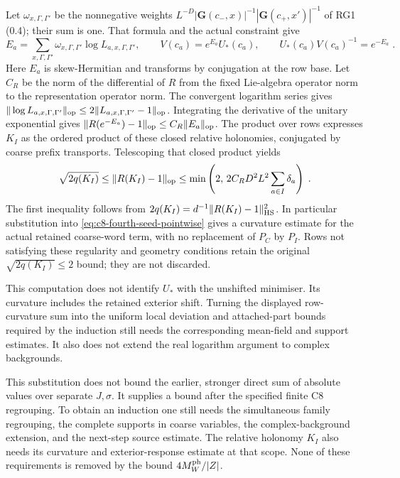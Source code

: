 \documentclass[11pt]{article}
\begin{document}
Let $\omega_{x,\Gamma,\Gamma'}$ be the nonnegative weights
$L^{-D}|\mathbf G(c_-,x)|^{-1}
|\mathbf G(c_+,x')|^{-1}$ of RG1 (0.4); their sum is one.
That formula and the actual constraint give
\begin{equation}\label{eq:c8-fourth-average-relative}
    E_a=\sum_{x,\Gamma,\Gamma'}\omega_{x,\Gamma,\Gamma'}
            \log L_{a,x,\Gamma,\Gamma'},\qquad
    V(c_a)=e^{E_a}U_*(c_a),\qquad
    U_*(c_a)V(c_a)^{-1}=e^{-E_a}\;.
\end{equation}
Here $E_a$ is skew-Hermitian and transforms by conjugation at
the row base. Let $C_R$ be the norm of the differential of $R$
from the fixed Lie-algebra operator norm to the representation
operator norm. The convergent logarithm series gives
$\|\log L_{a,x,\Gamma,\Gamma'}\|_{\rm op}
\leq2\|L_{a,x,\Gamma,\Gamma'}-1\|_{\rm op}$.
Integrating the derivative of the unitary exponential gives
$\|R(e^{-E_a})-1\|_{\rm op}\leq C_R\|E_a\|_{\rm op}$.
The product over rows expresses $K_I$ as the ordered product
of these closed relative holonomies, conjugated by coarse
prefix transports. Telescoping that closed product yields
\begin{equation}\label{eq:c8-fourth-coarse-curvature}
    \sqrt{2q(K_I)}
        \leq \|R(K_I)-1\|_{\rm op}
        \leq \min\left(2,\,
            2C_RD^2L^2\sum_{a\in I}\delta_a\right)\;.
\end{equation}
The first inequality follows from
$2q(K_I)=d^{-1}\|R(K_I)-1\|_{\rm HS}^2$.
In particular substitution into
\eqref{eq:c8-fourth-seed-pointwise} gives a curvature estimate
for the actual retained coarse-word term, with no replacement
of $P_C$ by $P_I$. Rows not satisfying these regularity and
geometry conditions retain the original $\sqrt{2q(K_I)}\leq2$
bound; they are not discarded.

This computation does not identify $U_*$ with the unshifted
minimiser. Its curvature includes the retained exterior shift.
Turning the displayed row-curvature sum into the uniform
local deviation and attached-part bounds required by the
induction still needs the corresponding mean-field and
support estimates. It also does not extend the real logarithm
argument to complex backgrounds.

This substitution does not bound the earlier, stronger direct sum
of absolute values over separate $J,\sigma$. It supplies a bound
after the specified finite C8 regrouping. To obtain an induction
one still needs the simultaneous family regrouping, the complete
supports in coarse variables, the complex-background extension,
and the next-step source estimate. The relative holonomy $K_I$
also needs its curvature and exterior-response estimate at that
scope. None of these requirements is removed by the bound
$4M_W^{\rm ph}/|Z|$.
\end{document}
